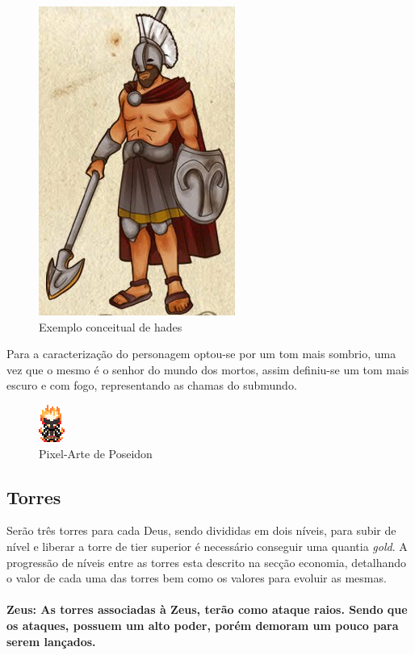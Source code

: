 \documentclass[11pt]{article} %
\begin{document}
\begin{figure}[!htp]
\centering
\includegraphics[scale=0.25]{res/characters/hades.png}
\caption{Exemplo conceitual de hades}
\label{satiro}
\end{figure}

Para a caracterização do personagem optou-se por um tom mais sombrio, uma vez que o mesmo é o senhor do mundo dos mortos, assim definiu-se um tom mais escuro e com fogo, representando as chamas do submundo.

\begin{figure}[!htp]
\centering
\includegraphics[scale=2]{res/characters/hades_panel.png}
\caption{Pixel-Arte de Poseidon}
\label{zeus}
\end{figure}

\newpage


\subsection{Torres}
Serão três torres para cada Deus, sendo divididas em dois níveis, para subir de nível e liberar a torre de tier superior é necessário conseguir uma quantia \textit{gold}. A progressão de níveis entre as torres esta descrito na secção economia, detalhando o valor de cada uma das torres bem como os valores para evoluir as mesmas.

\paragraph{{\Large Zeus}: As torres associadas à Zeus, terão como ataque raios. Sendo que os ataques, possuem um alto poder, porém demoram um pouco para serem lançados.}
\end{document}
